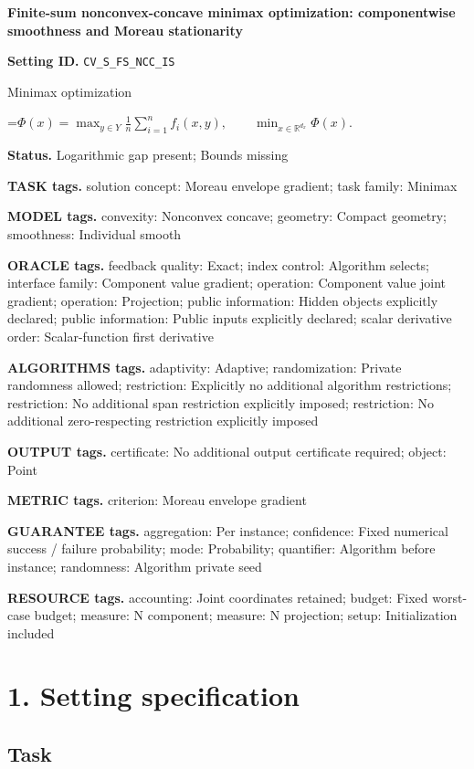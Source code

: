 \documentclass[10pt,a4paper]{article}
\newcommand{\AtlasMath}[1]{\par\begingroup\centering\setbox0=\hbox{$\displaystyle #1$}\ifdim\wd0>1.4\linewidth\typeout{ATLAS WIDE FORMULA: \the\wd0}\fi\ifdim\wd0>\linewidth\resizebox{\linewidth}{!}{\box0}\else\box0\fi\par\endgroup}
\begin{document}
\raggedright

{\LARGE\bfseries\sffamily\color{AtlasNavy} Finite-sum nonconvex-concave minimax optimization: componentwise smoothness and Moreau stationarity\par}\vspace{5pt}
\textbf{Setting ID.} \texttt{CV\_\allowbreak{}S\_\allowbreak{}FS\_\allowbreak{}NCC\_\allowbreak{}IS}

Minimax optimization


\AtlasMath{\Phi(x)=\max_{y\in Y}\frac1n\sum_{i=1}^n f_i(x,y),\qquad\min_{x\in\mathbb{R}^{d_x}}\Phi(x).}


\textbf{Status.} Logarithmic gap present; Bounds missing

\textbf{TASK tags.} solution concept: Moreau envelope gradient; task family: Minimax

\textbf{MODEL tags.} convexity: Nonconvex concave; geometry: Compact geometry; smoothness: Individual smooth

\textbf{ORACLE tags.} feedback quality: Exact; index control: Algorithm selects; interface family: Component value gradient; operation: Component value joint gradient; operation: Projection; public information: Hidden objects explicitly declared; public information: Public inputs explicitly declared; scalar derivative order: Scalar-function first derivative

\textbf{ALGORITHMS tags.} adaptivity: Adaptive; randomization: Private randomness allowed; restriction: Explicitly no additional algorithm restrictions; restriction: No additional span restriction explicitly imposed; restriction: No additional zero-respecting restriction explicitly imposed

\textbf{OUTPUT tags.} certificate: No additional output certificate required; object: Point

\textbf{METRIC tags.} criterion: Moreau envelope gradient

\textbf{GUARANTEE tags.} aggregation: Per instance; confidence: Fixed numerical success / failure probability; mode: Probability; quantifier: Algorithm before instance; randomness: Algorithm private seed

\textbf{RESOURCE tags.} accounting: Joint coordinates retained; budget: Fixed worst-case budget; measure: N component; measure: N projection; setup: Initialization included

\section{1. Setting specification}
\subsection{Task}
\end{document}
